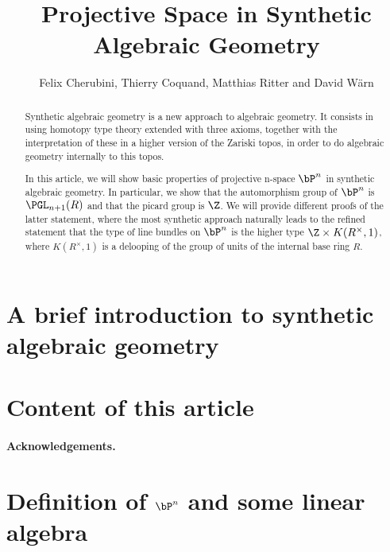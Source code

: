 \documentclass{../util/zariski-small}
\title{Projective Space in Synthetic Algebraic Geometry}
\begin{document}
\author{Felix Cherubini, Thierry Coquand, Matthias Ritter and David Wärn}

\maketitle

\begin{abstract}
  Synthetic algebraic geometry is a new approach to algebraic geometry. It consists in using homotopy type theory extended with three axioms, together with the interpretation of these in a higher version of the Zariski topos, in order to do algebraic geometry internally to this topos.
  
  In this article, we will show basic properties of projective n-space $\bP^n$ in synthetic algebraic geometry.
  In particular, we show that the automorphism group of $\bP^n$ is $\PGL_{n+1}(R)$ and that the picard group is $\Z$.
  We will provide different proofs of the latter statement, where the most synthetic approach naturally leads to the refined statement that the type of line bundles on $\bP^n$ is the higher type $\Z\times K(R^\times,1)$, where $K(R^\times,1)$ is a delooping of the group of units of the internal base ring $R$.
\end{abstract}

\section*{A brief introduction to synthetic algebraic geometry}


\section*{Content of this article}

\paragraph{Acknowledgements.}


\section[Definition of projective space and some linear algebra]{Definition of $\bP^n$ and some linear algebra}


%
\end{document}
